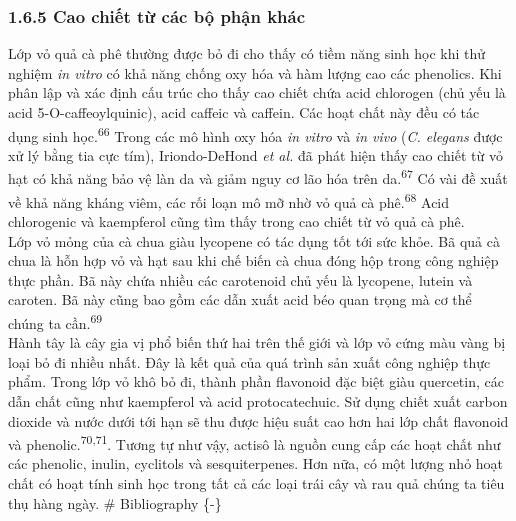 \documentclass[
  letterpaper,
  DIV=11,
  numbers=noendperiod]{scrartcl}
\begin{document}
\subsubsection{1.6.5 Cao chiết từ các bộ phận
khác}\label{cao-chiux1ebft-tux1eeb-cuxe1c-bux1ed9-phux1eadn-khuxe1c}

Lớp vỏ quả cà phê thường được bỏ đi cho thấy có tiềm năng sinh học khi
thử nghiệm \emph{in vitro} có khả năng chống oxy hóa và hàm lượng cao
các phenolics. Khi phân lập và xác định cấu trúc cho thấy cao chiết chứa
acid chlorogen (chủ yếu là acid 5-O-caffeoylquinic), acid caffeic và
caffein. Các hoạt chất này đều có tác dụng sinh học.\textsuperscript{66}
Trong các mô hình oxy hóa \emph{in vitro} và \emph{in vivo} (\emph{C.
elegans} được xử lý bằng tia cực tím), Iriondo-DeHond \emph{et al.} đã
phát hiện thấy cao chiết từ vỏ hạt có khả năng bảo vệ làn da và giảm
nguy cơ lão hóa trên da.\textsuperscript{67} Có vài đề xuất về khả năng
kháng viêm, các rối loạn mô mỡ nhờ vỏ quả cà phê.\textsuperscript{68}
Acid chlorogenic và kaempferol cũng tìm thấy trong cao chiết từ vỏ quả
cà phê.\\
Lớp vỏ mỏng của cà chua giàu lycopene có tác dụng tốt tới sức khỏe. Bã
quả cà chua là hỗn hợp vỏ và hạt sau khi chế biến cà chua đóng hộp trong
công nghiệp thực phần. Bã này chứa nhiều các carotenoid chủ yếu là
lycopene, lutein và caroten. Bã này cũng bao gồm các dẫn xuất acid béo
quan trọng mà cơ thể chúng ta cần.\textsuperscript{69}\\
Hành tây là cây gia vị phổ biến thứ hai trên thế giới và lớp vỏ cứng màu
vàng bị loại bỏ đi nhiều nhất. Đây là kết quả của quá trình sản xuất
công nghiệp thực phẩm. Trong lớp vỏ khô bỏ đi, thành phần flavonoid đặc
biệt giàu quercetin, các dẫn chất cũng như kaempferol và acid
protocatechuic. Sử dụng chiết xuất carbon dioxide và nước dưới tới hạn
sẽ thu được hiệu suất cao hơn hai lớp chất flavonoid và
phenolic.\textsuperscript{70,71}. Tương tự như vậy, actisô là nguồn cung
cấp các hoạt chất như các phenolic, inulin, cyclitols và sesquiterpenes.
Hơn nữa, có một lượng nhỏ hoạt chất có hoạt tính sinh học trong tất cả
các loại trái cây và rau quả chúng ta tiêu thụ hàng ngày. \#
Bibliography \{-\}
\end{document}
